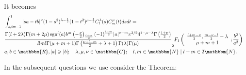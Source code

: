 \documentclass{article}
\newcommand{\tmop}[1]{\ensuremath{\operatorname{#1}}}
\begin{document}
It becomes
\begin{eqnarray}
  & \int_{s, t = - 1}^1 | s a - t b |^{\nu} (1 - s^2)^{\lambda - \frac{1}{2}}
  (1 - t^2)^{\mu - \frac{1}{2}} C_l^{\lambda} (s) C_m^{\mu} (t) d s d t = & 
  \nonumber\\
  & \frac{\Gamma (l + 2 \lambda) \Gamma (m + 2 \mu) \tmop{sgn}^l (a) b^m
  \left( - \frac{\nu}{2} \right)_{\frac{l + m}{2}} (- 1)^{\frac{l - m}{2}} | a
  |^{\nu - m} \pi^{3 / 2} 4^{1 - \mu - \lambda} \Gamma \left( \frac{1 +
  \nu}{2} \right)}{l!m! \Gamma (\mu + m + 1) \Gamma \left( \frac{\nu + l -
  m}{2} + \lambda + 1 \right) \Gamma (\lambda) \Gamma (\mu)} _2 F_1 \left(
  \begin{array}{c}
    \frac{l + m - \nu}{2}, \frac{m - \nu - l}{2} - \lambda\\
    \mu + m + 1
  \end{array} ; \frac{b^2}{a^2} \right) &  \nonumber\\
  & a, b \in \mathbbm{R}, | a | \geqslant | b | ; \quad \lambda, \mu, \nu \in
  \mathbbm{C}; \quad l, m \in \mathbbm{N} \mid l + m \in 2\mathbbm{N}. & 
  \nonumber
\end{eqnarray}


In the subsequent questions we use consider the Theorem:

\
\end{document}

